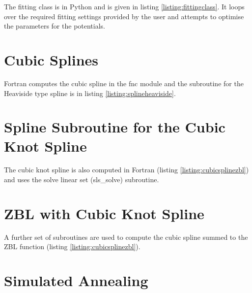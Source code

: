 The fitting class is in Python and is given in listing \ref{listing:fittingclass}.  It loops over the required fitting settings provided by the user and attempts to optimise the parameters for the potentials.





\section{Cubic Splines}
\label{section:appendixcubicspline}

Fortran computes the cubic spline in the fnc module and the subroutine for the Heaviside type spline is in listing \ref{listing:splineheaviside}.




\section{Spline Subroutine for the Cubic Knot Spline}
\label{section:appendixcubicknotspline}

The cubic knot spline is also computed in Fortran (listing \ref{listing:cubicsplinezbl}) and uses the solve linear set (sls\_solve) subroutine.




\section{ZBL with Cubic Knot Spline}
\label{section:appendixcubicknotsplinezbl}

A further set of subroutines are used to compute the cubic spline summed to the ZBL function (listing \ref{listing:cubicsplinezbl}).





\section{Simulated Annealing}
\label{section:simulatedannealing}

